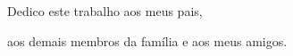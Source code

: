 \begin{dedicatoria}
  Dedico este trabalho aos meus pais,
  
  aos demais membros da família e aos meus amigos.
\end{dedicatoria}